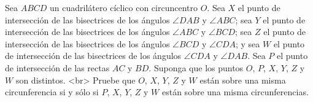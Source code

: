 Sea $ABCD$ un cuadrilátero cíclico con circuncentro $O$. Sea $X$ el punto de intersección de las bisectrices de los ángulos $\angle DAB$ y $\angle ABC$; sea $Y$ el punto de intersección de las bisectrices de los ángulos $\angle ABC$ y $\angle BCD$; sea $Z$ el punto de intersección de las bisectrices de los ángulos $\angle BCD$ y $\angle CDA$; y sea $W$ el punto de intersección de las bisectrices de los ángulos $\angle CDA$ y $\angle DAB$. Sea $P$ el punto de intersección de las rectas $AC$ y $BD$. Suponga que los puntos $O$, $P$, $X$, $Y$, $Z$ y $W$ son distintos.
<br>
Pruebe que $O$, $X$, $Y$, $Z$ y $W$ están sobre una misma circunferencia si y sólo si $P$, $X$, $Y$, $Z$ y $W$ están sobre una misma circunferencias.